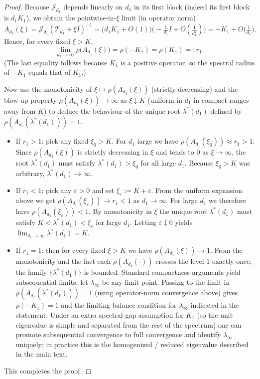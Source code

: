 \documentclass[a4paper,11pt]{amsart}
\theoremstyle{definition}
\numberwithin{equation}{section}
\theoremstyle{definition}
\begin{document}
\begin{proof}
Because $\mathscr J_{d_1}$ depends linearly on $d_1$ in its first block (indeed its first block is $d_1 K_1$), we obtain the pointwise-in-$\xi$ limit (in operator norm)
\[
A_{d_1}(\xi)=\mathscr J_{d_1}(\mathscr T_{d_1}+\xi I)^{-1}
= \big( d_1 K_1 + O(1)\big)\big(-\tfrac{1}{d_1}I + O(\tfrac{1}{d_1^2})\big)
= -K_1 + O\!\big(\tfrac{1}{d_1}\big).
\]
Hence, for every fixed $\xi>K$,
\[
\lim_{d_1\to\infty}\rho\!\big(A_{d_1}(\xi)\big) = \rho(-K_1) = \rho(K_1)=:r_1.
\]
(The last equality follows because \(K_1\) is a positive operator, so the spectral radius of \(-K_1\)
equals that of \(K_1\).)

Now use the monotonicity of $\xi\mapsto\rho(A_{d_1}(\xi))$ (strictly decreasing) and the blow-up property
\(\rho(A_{d_1}(\xi))\to\infty\) as \(\xi\downarrow K\) (uniform in $d_1$ in compact ranges away from \(K\)) to deduce the behaviour of the unique root \(\lambda^\ast(d_1)\) defined by \(\rho(A_{d_1}(\lambda^\ast(d_1)))=1\).

\begin{itemize}
\item If \(r_1>1\): pick any fixed \(\xi_0>K\). For $d_1$ large we have
\(\rho(A_{d_1}(\xi_0))\approx r_1>1\). Since \(\rho(A_{d_1}(\xi))\) is strictly decreasing in \(\xi\) and tends to \(0\) as \(\xi\to\infty\),
the root \(\lambda^\ast(d_1)\) must satisfy \(\lambda^\ast(d_1)>\xi_0\) for all large \(d_1\). Because \(\xi_0>K\) was arbitrary, \(\lambda^\ast(d_1)\to\infty\).

\item If \(r_1<1\): pick any \(\varepsilon>0\) and set \(\xi_\varepsilon:=K+\varepsilon\). From the uniform expansion above
we get \(\rho(A_{d_1}(\xi_\varepsilon))\to r_1<1\) as \(d_1\to\infty\). For large \(d_1\) we therefore have
\(\rho(A_{d_1}(\xi_\varepsilon))<1\). By monotonicity in \(\xi\) the unique root \(\lambda^\ast(d_1)\) must satisfy
\(K<\lambda^\ast(d_1)<\xi_\varepsilon\) for large \(d_1\). Letting \(\varepsilon\downarrow0\) yields
\(\lim_{d_1\to\infty}\lambda^\ast(d_1)=K\).

\item If \(r_1=1\): then for every fixed \(\xi>K\) we have \(\rho(A_{d_1}(\xi))\to1\). From the monotonicity and the fact each $\rho(A_{d_1}(\cdot))$ crosses the level \(1\) exactly once, the family \(\{\lambda^\ast(d_1)\}\) is bounded. Standard compactness arguments yield subsequential limits; let \(\lambda_\infty\) be any limit point. Passing to the limit in
\(\rho(A_{d_1}(\lambda^\ast(d_1)))=1\) (using operator-norm convergence above) gives
\(\rho(-K_1)=1\) and the limiting balance condition for \(\lambda_\infty\) indicated in the statement. Under an extra spectral-gap assumption for \(K_1\) (so the unit eigenvalue is simple and separated from the rest of the spectrum) one can promote subsequential convergence to full convergence and identify \(\lambda_\infty\) uniquely; in practice this is the homogenized / reduced eigenvalue described in the main text.
\end{itemize}

This completes the proof.
\end{proof}
\end{document}
